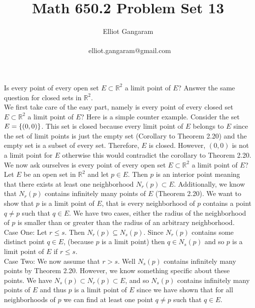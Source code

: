 \documentclass[12pt]{article}
\title{Math 650.2  Problem Set 13}
\author{Elliot Gangaram\\
\date{}
\ elliot.gangaram@gmail.com \\}
\begin{document}
\maketitle

\problem Is every point of every open set $E \subset \mathbb{R}^{2}$ a limit point of $E$? Answer the same question for closed sets in $\mathbb{R}^{2}.$ \\

We first take care of the easy part, namely is every point of every closed set $E \subset \mathbb{R}^{2}$ a limit point of $E$? Here is a simple counter example. Consider the set $E= \left\{(0,0)\right\}$. This set is closed because every limit point of $E$ belongs to $E$ since the set of limit points is just the empty set (Corollary to Theorem 2.20) and the empty set is a subset of every set. Therefore, $E$ is closed. However, $(0,0)$ is not a limit point for $E$ otherwise this would contradict the corollary to Theorem 2.20. \\ 

We now ask ourselves is every point of every open set $E \subset \mathbb{R}^{2}$ a limit point of $E$? Let $E$ be an open set in $\mathbb{R}^{2}$ and let $p \in E$. Then $p$ is an interior point meaning that there exists at least one neighborhood $N_{r}(p) \subset E$. Additionally, we know that $N_{r}(p)$ contains infinitely many points of $E$ (Theorem 2.20). We want to show that $p$ is a limit point of $E$, that is every neighborhood of $p$ contains a point $q \neq p$ such that $q \in E$. We have two cases, either the radius of the neighborhood of $p$ is smaller than or greater than the radius of an arbitrary neighborhood. \\

Case One: Let $r \leq s$. Then $N_{r}(p) \subseteq N_{s}(p)$. Since $N_{r}(p)$ contains some distinct point $q \in E$, (because $p$ is a limit point) then $q \in N_{s}(p)$ and so $p$ is a limit point of $E$ if $r \leq s$. \\

Case Two: We now assume that $r>s$. Well $N_{s}(p)$ contains infinitely many points by Theorem 2.20. However, we know something specific about these points. We have $N_{s}(p) \subset N_{r}(p) \subset E$, and so $N_{s}(p)$ contains infinitely many points of $E$ and thus $p$ is a limit point of $E$ since we have shown that for all neighborhoods of $p$ we can find at least one point $q \neq p$ such that $q \in E$. \\ \\
\end{document}
